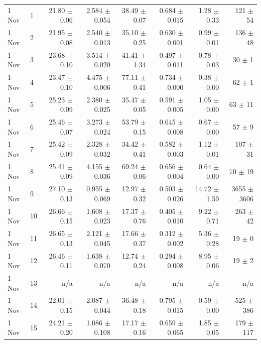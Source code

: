 \begin{table}
\begin{tabular}{llrrrrrr}
1 Nov & 1 & 21.80 $\pm$ 0.06 & 2.584 $\pm$ 0.054 & 38.49 $\pm$ 0.07 & 0.684 $\pm$ 0.015 & 1.28 $\pm$ 0.33 & 121 $\pm$ 54 \\
1 Nov & 2 & 21.95 $\pm$ 0.08 & 2.540 $\pm$ 0.013 & 35.10 $\pm$ 0.25 & 0.630 $\pm$ 0.001 & 0.99 $\pm$ 0.01 & 136 $\pm$ 48 \\
1 Nov & 3 & 23.68 $\pm$ 0.10 & 3.514 $\pm$ 0.020 & 41.41 $\pm$ 1.34 & 0.497 $\pm$ 0.011 & 0.78 $\pm$ 0.03 & 30 $\pm$ 1 \\
1 Nov & 4 & 23.47 $\pm$ 0.10 & 4.475 $\pm$ 0.006 & 77.11 $\pm$ 0.41 & 0.734 $\pm$ 0.000 & 0.38 $\pm$ 0.00 & 62 $\pm$ 1 \\
1 Nov & 5 & 25.23 $\pm$ 0.09 & 2.380 $\pm$ 0.025 & 35.47 $\pm$ 0.05 & 0.591 $\pm$ 0.005 & 1.05 $\pm$ 0.00 & 63 $\pm$ 11 \\
1 Nov & 6 & 25.46 $\pm$ 0.07 & 3.273 $\pm$ 0.024 & 53.79 $\pm$ 0.15 & 0.645 $\pm$ 0.008 & 0.67 $\pm$ 0.00 & 57 $\pm$ 9 \\
1 Nov & 7 & 25.42 $\pm$ 0.09 & 2.328 $\pm$ 0.032 & 34.42 $\pm$ 0.41 & 0.582 $\pm$ 0.003 & 1.12 $\pm$ 0.01 & 107 $\pm$ 31 \\
1 Nov & 8 & 25.41 $\pm$ 0.09 & 4.155 $\pm$ 0.036 & 69.24 $\pm$ 0.06 & 0.656 $\pm$ 0.004 & 0.64 $\pm$ 0.00 & 70 $\pm$ 19 \\
1 Nov & 9 & 27.10 $\pm$ 0.13 & 0.955 $\pm$ 0.069 & 12.97 $\pm$ 0.32 & 0.503 $\pm$ 0.026 & 14.72 $\pm$ 1.59 & 3655 $\pm$ 3606 \\
1 Nov & 10 & 26.66 $\pm$ 0.15 & 1.608 $\pm$ 0.023 & 17.37 $\pm$ 0.76 & 0.405 $\pm$ 0.010 & 9.22 $\pm$ 0.71 & 263 $\pm$ 42 \\
1 Nov & 11 & 26.65 $\pm$ 0.13 & 2.121 $\pm$ 0.045 & 17.66 $\pm$ 0.37 & 0.312 $\pm$ 0.002 & 5.36 $\pm$ 0.28 & 19 $\pm$ 0 \\
1 Nov & 12 & 26.46 $\pm$ 0.11 & 1.638 $\pm$ 0.070 & 12.74 $\pm$ 0.24 & 0.294 $\pm$ 0.008 & 8.95 $\pm$ 0.06 & 19 $\pm$ 2 \\
1 Nov & 13 & n/a & n/a & n/a & n/a & n/a & n/a \\
1 Nov & 14 & 22.01 $\pm$ 0.15 & 2.087 $\pm$ 0.044 & 36.48 $\pm$ 0.18 & 0.795 $\pm$ 0.015 & 0.59 $\pm$ 0.00 & 525 $\pm$ 386 \\
1 Nov & 15 & 24.21 $\pm$ 0.20 & 1.086 $\pm$ 0.108 & 17.17 $\pm$ 0.16 & 0.659 $\pm$ 0.065 & 1.85 $\pm$ 0.05 & 179 $\pm$ 117 \\
\bottomrule
\end{tabular}
\end{table}
